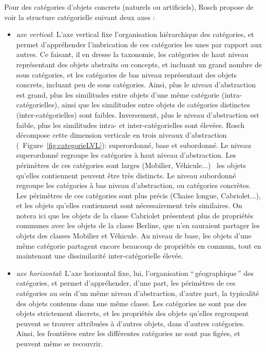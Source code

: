 {Pour des catégories d'objets concrets (naturels ou artificiels), Rosch propose de voir la structure catégorielle suivant deux axes \citep[p. 30-41]{rosch1978cognition}:

\begin{itemize}
\item \textit{axe vertical}: L'axe vertical fixe l'organisation hiérarchique des catégories, et permet d'appréhender l'imbrication de ces catégories les unes par rapport aux autres. Ce faisant, il en dresse la taxonomie, les catégories de haut niveau représentant des objets abstraits ou concepts, et incluant un grand nombre de sous catégories, et les catégories de bas niveau représentant des objets concrets, incluant peu de sous catégories. Ainsi, plus le niveau d'abstraction est grand, plus les similitudes entre objets d'une même catégorie (intra-catégorielles), ainsi que les similitudes entre objets de catégories distinctes (inter-catégorielles) sont faibles. Inversement, plus le niveau d'abstraction est faible, plus les similitudes intra- et inter-catégorielles sont élevées. Rosch décompose cette dimension verticale en trois niveaux d'abstraction (\cf~Figure~\ref{fig:categorieLVL}): superordonné, base et subordonné. Le niveau superordonné regroupe les catégories à haut niveau d'abstraction. Les périmètres de ces catégories sont larges (Mobilier, Véhicule...) \ie~les objets qu'elles contiennent peuvent être très distincts. Le niveau subordonné regroupe les catégories à bas niveau d'abstraction, ou catégories concrètes. Les périmètres de ces catégories sont plus précis (Chaise longue, Cabriolet...), et les objets qu'elles contiennent sont nécessairement très similaires. On notera ici que les objets de la classe Cabriolet présentent plus de propriétés communes avec les objets de la classe Berline, que n'en sauraient partager les objets des classes Mobilier et Véhicule. Au niveau de base, les objets d'une même catégorie partagent encore beaucoup de propriétés en commun, tout en maintenant une dissimilarité inter-catégorielle élevée.
\item \textit{axe horizontal}: L'axe horizontal fixe, lui, l'organisation ``\,géographique\,'' des catégories, et permet d'appréhender, d'une part, les périmètres de ces catégories au sein d'un même niveau d'abstraction, d'autre part, la typicalité des objets contenus dans une même classe. Les catégories ne sont pas des objets strictement discrets, et les propriétés des objets qu'elles regroupent peuvent se trouver attribuées à d'autres objets, dans d'autres catégories. Ainsi, les frontières entre les différentes catégories ne sont pas figées, et peuvent même se recouvrir.
\end{itemize}

}
